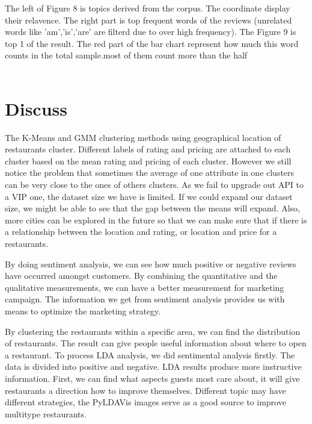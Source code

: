 \documentclass[a4paper]{article}
\begin{document}
The left of Figure 8 is topics derived from the corpus. The coordinate display their relavence. The right part is top frequent words of the reviews (unrelated words like 'am','is','are' are filterd due to over high frequency).
The Figure 9 is top 1 of the result. The red part of the bar chart represent how much this word counts in the total sample.most of them count more than the half
\
\\
\\
\section{Discuss}

The K-Means and GMM clustering methods using geographical location of restaurants cluster. Different labels of rating and pricing are attached to each cluster based on the mean rating and pricing of each cluster. However we still notice the problem that sometimes the average of one attribute in one clusters can be very close to the ones of others clusters. As we fail to upgrade out API to a VIP one, the dataset size we have is limited. If we could expand our dataset size, we might be able to see that the gap between the means will expand. Also, more cities can be explored in the future so that we can make sure that if there is a relationship between the location and rating, or location and price for a restaurants.

By doing sentiment analysis, we can see how much positive or negative reviews have occurred amongst customers. By combining the quantitative and the qualitative measurements, we can have a better measurement for marketing campaign. The information we get from sentiment analysis provides us with means to optimize the marketing strategy.

By clustering the restaurants within a specific area, we can find the distribution of restaurants. The result can give people useful information about where to open a restaurant.
To process LDA analysis, we did sentimental analysis firstly. The data is divided into positive and negative.
LDA results produce more instructive information. First, we can find what aspects guests most care about, it will give restaurants a direction how to improve themselves. Different topic may have different strategies, the PyLDAVis images serve as a good source to improve multitype restaurants.
\end{document}
